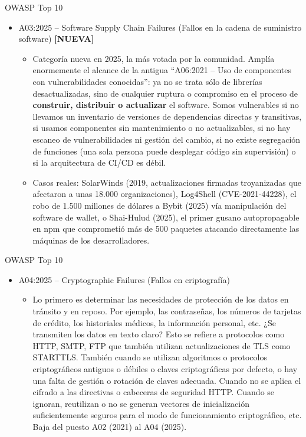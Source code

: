 \documentclass[aspectratio=169,10pt]{beamer}
\begin{document}
\begin{frame}[allowframebreaks]{OWASP Top 10}
\small
  \begin{itemize}
  \item A03:2025 -- Software Supply Chain Failures (Fallos en la cadena de suministro software) \textbf{[NUEVA]}
  \begin{itemize}
  \item Categoría nueva en 2025, la más votada por la comunidad. Amplía enormemente el alcance de la antigua ``A06:2021 -- Uso de componentes con vulnerabilidades conocidas'': ya no se trata sólo de librerías desactualizadas, sino de cualquier ruptura o compromiso en el proceso de \textbf{construir, distribuir o actualizar} el software. Somos vulnerables si no llevamos un inventario de versiones de dependencias directas y transitivas, si usamos componentes sin mantenimiento o no actualizables, si no hay escaneo de vulnerabilidades ni gestión del cambio, si no existe segregación de funciones (una sola persona puede desplegar código sin supervisión) o si la arquitectura de CI/CD es débil.
  \item Casos reales: SolarWinds (2019, actualizaciones firmadas troyanizadas que afectaron a unas 18.000 organizaciones), Log4Shell (CVE-2021-44228), el robo de 1.500 millones de dólares a Bybit (2025) vía manipulación del software de wallet, o Shai-Hulud (2025), el primer gusano autopropagable en npm que comprometió más de 500 paquetes atacando directamente las máquinas de los desarrolladores.
  \end{itemize}
\end{itemize}
\end{frame}

\begin{frame}[allowframebreaks]{OWASP Top 10}
\small
  \begin{itemize}
  \item A04:2025 -- Cryptographic Failures (Fallos en criptografía)
  \begin{itemize}
  \item Lo primero es determinar las necesidades de protección de los datos en tránsito y en reposo. Por ejemplo, las contraseñas, los números de tarjetas de crédito, los historiales médicos, la información personal, etc. ¿Se transmiten los datos en texto claro? Esto se refiere a protocolos como HTTP, SMTP, FTP que también utilizan actualizaciones de TLS como STARTTLS. También cuando se utilizan algoritmos o protocolos criptográficos antiguos o débiles o claves criptográficas por defecto, o hay una falta de gestión o rotación de claves adecuada. Cuando no se aplica el cifrado a las directivas o cabeceras de seguridad HTTP. Cuando se ignoran, reutilizan o no se generan vectores de inicialización suficientemente seguros para el modo de funcionamiento criptográfico, etc. Baja del puesto A02 (2021) al A04 (2025).
\end{itemize}  
\end{itemize}
\end{frame}
\end{document}
